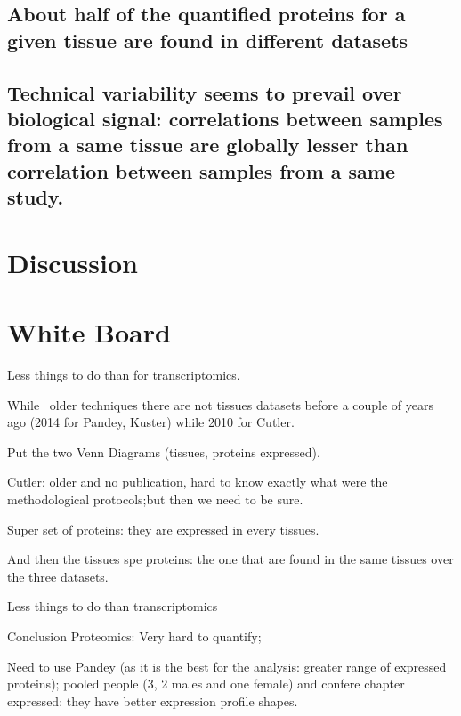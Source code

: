 \subsection{About half of the quantified proteins for a given tissue are found
in different datasets}

\subsection{Technical variability seems to prevail over biological signal:
correlations between samples from a same tissue are globally lesser than
correlation between samples from a same study.}


\section{Discussion}





\section{White Board}

Less things to do than for transcriptomics.

While \ms\ older techniques there are not tissues datasets before a couple of
years ago (2014 for Pandey, Kuster) while 2010 for Cutler.


Put the two Venn Diagrams (tissues, proteins expressed).

Cutler: older and no publication,
hard to know exactly what were the methodological protocols;but then we need to
be sure.

Super set of proteins: they are expressed in every tissues.

And then the tissues spe proteins: the one that are found in the same tissues
over the three datasets.


Less things to do than transcriptomics

Conclusion Proteomics: Very hard to quantify;

Need to use Pandey (as it is the best for the analysis:
greater range of expressed proteins); pooled people (3, 2 males and one female)
and confere chapter expressed: they have better expression profile shapes.




